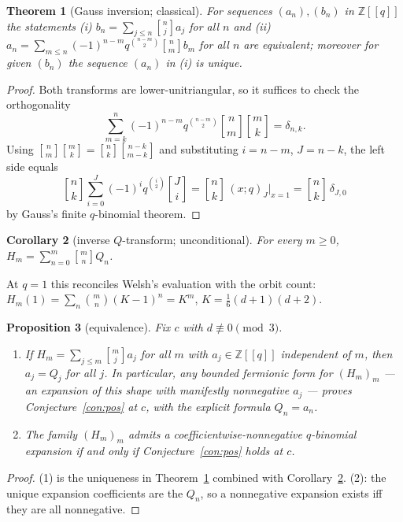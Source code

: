 \documentclass[11pt]{article}
\newtheorem{theorem}{Theorem}[section]
\newtheorem{corollary}[theorem]{Corollary}
\newtheorem{proposition}[theorem]{Proposition}
\newcommand{\qbin}[2]{\genfrac{[}{]}{0pt}{}{#1}{#2}}
\newcommand{\ZZ}{\mathbb{Z}}
\begin{document}
\begin{theorem}[Gauss inversion; classical]\label{thm:G}
For sequences $(a_n),(b_n)$ in $\ZZ[[q]]$ the statements
\textup{(i)} $b_n=\sum_{j\le n}\qbin{n}{j}a_j$ for all $n$ and
\textup{(ii)} $a_n=\sum_{m\le n}(-1)^{n-m}q^{\binom{n-m}{2}}\qbin{n}{m}b_m$
for all $n$ are equivalent; moreover for given $(b_n)$ the sequence
$(a_n)$ in \textup{(i)} is unique.
\end{theorem}

\begin{proof}
Both transforms are lower-unitriangular, so it suffices to check the
orthogonality
\[
\sum_{m=k}^{n}(-1)^{n-m}q^{\binom{n-m}{2}}\qbin{n}{m}\qbin{m}{k}
=\delta_{n,k} .
\]
Using $\qbin{n}{m}\qbin{m}{k}=\qbin{n}{k}\qbin{n-k}{m-k}$ and
substituting $i=n-m$, $J=n-k$, the left side equals
\[
\qbin{n}{k}\sum_{i=0}^{J}(-1)^iq^{\binom{i}{2}}\qbin{J}{i}
=\qbin{n}{k}\,(x;q)_J\Big|_{x=1}=\qbin{n}{k}\,\delta_{J,0}
\]
by Gauss's finite $q$-binomial theorem.
\end{proof}

\begin{corollary}[inverse $Q$-transform; unconditional]\label{cor:inv}
For every $m\ge0$,
$\displaystyle H_m=\sum_{n=0}^{m}\qbin{m}{n}Q_n$.
\end{corollary}

At $q=1$ this reconciles Welsh's evaluation with the orbit count:
$H_m(1)=\sum_n\binom{m}{n}(K-1)^n=K^m$, $K=\tfrac16(d+1)(d+2)$.

\begin{proposition}[equivalence]\label{prop:equiv}
Fix $c$ with $d\not\equiv0\pmod3$.
\begin{enumerate}
\item[\textup{(1)}] If $H_m=\sum_{j\le m}\qbin{m}{j}a_j$ for all $m$ with
$a_j\in\ZZ[[q]]$ independent of $m$, then $a_j=Q_j$ for all $j$. In
particular, any bounded fermionic form for $(H_m)_m$ --- an expansion of
this shape with manifestly nonnegative $a_j$ --- proves
Conjecture~\ref{con:pos} at $c$, with the explicit formula $Q_n=a_n$.
\item[\textup{(2)}] The family $(H_m)_m$ admits a
coefficientwise-nonnegative $q$-binomial expansion \emph{if and only if}
Conjecture~\ref{con:pos} holds at $c$.
\end{enumerate}
\end{proposition}

\begin{proof}
(1) is the uniqueness in Theorem~\ref{thm:G} combined with
Corollary~\ref{cor:inv}. (2): the unique expansion coefficients are the
$Q_n$, so a nonnegative expansion exists iff they are all nonnegative.
\end{proof}
\end{document}
